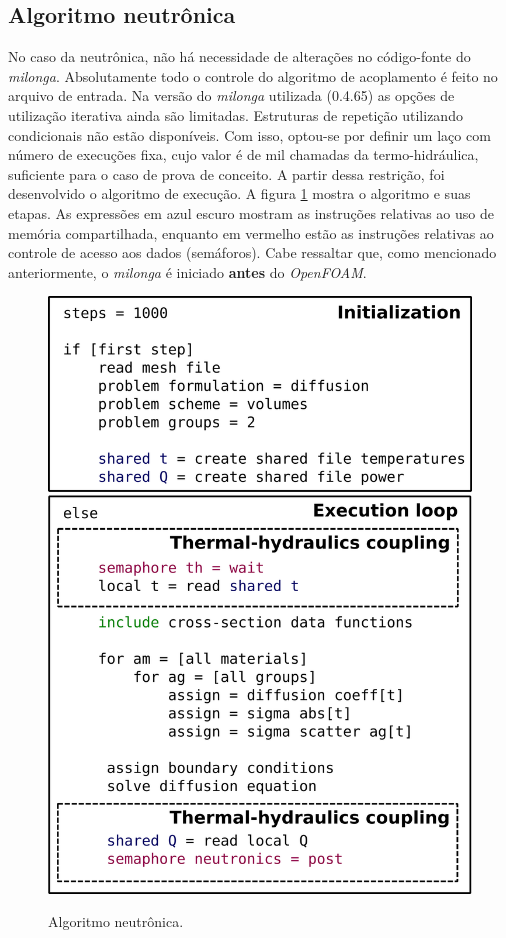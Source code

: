 \subsection{Algoritmo neutrônica}

No caso da neutrônica, não há necessidade de alterações no código-fonte do \textit{milonga}. Absolutamente
todo o controle do algoritmo de acoplamento é feito no arquivo de entrada. Na versão do
\textit{milonga} utilizada (0.4.65) as opções de utilização iterativa ainda são limitadas. Estruturas
de repetição utilizando condicionais não estão disponíveis. Com isso, optou-se por definir um laço com número
de execuções fixa, cujo valor é de mil chamadas da termo-hidráulica, suficiente para o caso de prova
de conceito. A partir dessa restrição, foi desenvolvido o algoritmo de execução. A figura
\ref{fig:algo_neutronica} mostra o algoritmo e suas etapas. As expressões em azul escuro mostram as instruções
relativas ao uso de memória compartilhada, enquanto em vermelho estão
as instruções relativas ao controle de acesso aos dados (semáforos). Cabe ressaltar que,
como mencionado anteriormente,
o \textit{milonga} é iniciado \textbf{antes} do \textit{OpenFOAM}.

\begin{figure}[htb]
  \caption{Algoritmo neutrônica.}
  \centering\includegraphics[scale=0.5]{figuras/algoritmos_milonga.png}
  \label{fig:algo_neutronica}
\end{figure}

